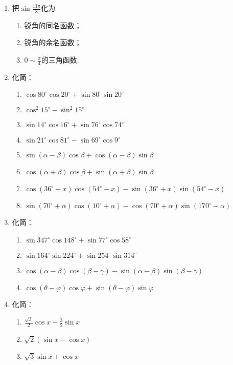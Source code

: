 \begin{enumerate}
    \item 把$\sin\frac{11\pi}{8}$化为
\begin{multicols}{3}
\begin{enumerate}[(1)]
    \item 锐角的同名函数；
    \item 锐角的余名函数；
    \item $0\sim \frac{\pi}{4}$的三角函数.
\end{enumerate}
\end{multicols}

\item 化简：
\begin{enumerate}[(1)]
    \item $\cos80^{\circ}\cos20^{\circ}+\sin80^{\circ}\sin20^{\circ}$
    \item $\cos^{2}15^{\circ}-\sin^{2}15^{\circ}$
    \item $\sin14^{\circ}\cos16^{\circ}+\sin76^{\circ}\cos74^{\circ}$ 
    \item $\sin21^{\circ}\cos81^{\circ}-\sin69^{\circ}\cos9^{\circ}$ 
    \item $\sin\left(\alpha-\beta\right)\cos\beta+\cos\left(\alpha-\beta\right)\sin\beta$ 
    \item $\cos\left(\alpha+\beta\right)\cos\beta+\sin\left(\alpha+\beta\right)\sin\beta$ 
    \item $\cos\left(36^{\circ}+x\right)\cos\left(54^{\circ}-x\right)-\sin(36^{\circ}+x)\sin(54^{\circ}-x)$
    \item $\sin\left(70^{\circ}+\alpha\right)\cos\left(10^{\circ}+\alpha\right)-\cos\left(70^{\circ}+\alpha\right)\sin\left(170^{\circ}-\alpha\right)$
\end{enumerate}

\item 化简：
\begin{enumerate}[(1)]
    \item $\sin347^{\circ}\cos148^{\circ}+\sin77^{\circ}\cos58^{\circ}$
    \item $\sin164^{\circ}\sin224^{\circ}+\sin254^{\circ}\sin314^{\circ}$
    \item $\cos(\alpha-\beta)\cos(\beta-\gamma)-\sin(\alpha-\beta)\sin(\beta-\gamma)$
    \item $\cos(\theta-\varphi)\cos\varphi+\sin(\theta-\varphi)\sin\varphi$
\end{enumerate}

\item 化简：
\begin{multicols}{2}
\begin{enumerate}[(1)]
    \item $\frac{\sqrt{3}}{2}\cos x-\frac{3}{2}\sin x$
    \item $\sqrt{2}(\sin x-\cos x)$
    \item $\sqrt{3}\sin x+\cos x$
\end{enumerate}
\end{multicols}


\end{enumerate}

